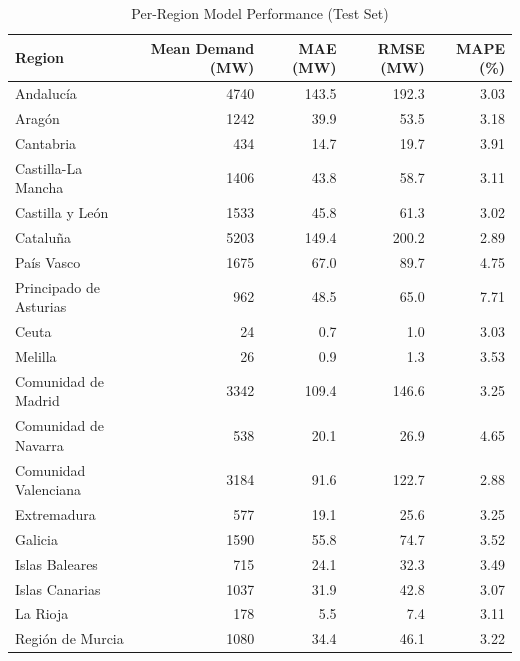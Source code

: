 \begin{table}[h]
\centering
\caption{Per-Region Model Performance (Test Set)}
\label{tab:regional}
\begin{tabular}{@{}lrrrr@{}}\toprule
Region & Mean Demand (MW) & MAE (MW) & RMSE (MW) & MAPE (\%) \\ \midrule
Andalucía & 4740 & 143.5 & 192.3 & 3.03 \\
Aragón & 1242 & 39.9 & 53.5 & 3.18 \\
Cantabria & 434 & 14.7 & 19.7 & 3.91 \\
Castilla-La Mancha & 1406 & 43.8 & 58.7 & 3.11 \\
Castilla y León & 1533 & 45.8 & 61.3 & 3.02 \\
Cataluña & 5203 & 149.4 & 200.2 & 2.89 \\
País Vasco & 1675 & 67.0 & 89.7 & 4.75 \\
Principado de Asturias & 962 & 48.5 & 65.0 & 7.71 \\
Ceuta & 24 & 0.7 & 1.0 & 3.03 \\
Melilla & 26 & 0.9 & 1.3 & 3.53 \\
Comunidad de Madrid & 3342 & 109.4 & 146.6 & 3.25 \\
Comunidad de Navarra & 538 & 20.1 & 26.9 & 4.65 \\
Comunidad Valenciana & 3184 & 91.6 & 122.7 & 2.88 \\
Extremadura & 577 & 19.1 & 25.6 & 3.25 \\
Galicia & 1590 & 55.8 & 74.7 & 3.52 \\
Islas Baleares & 715 & 24.1 & 32.3 & 3.49 \\
Islas Canarias & 1037 & 31.9 & 42.8 & 3.07 \\
La Rioja & 178 & 5.5 & 7.4 & 3.11 \\
Región de Murcia & 1080 & 34.4 & 46.1 & 3.22 \\
\bottomrule
\end{tabular}
\end{table}
